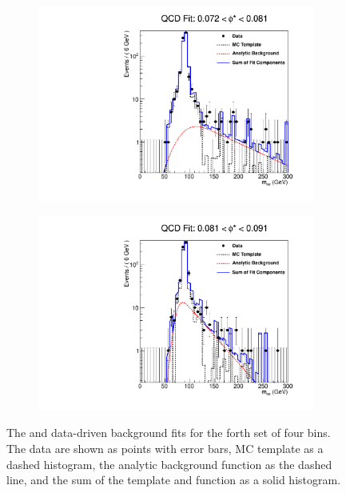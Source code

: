 \begin{figure}[!htbp]
\begin{subfigure}[b]{\SideBySidePlotWidth}
        \includegraphics[width=\linewidth]{figures/qcd_fits/qcd_fit_plot_for_15.pdf}
        \label{fig:qcd_fit_15}
    \end{subfigure}%
    \begin{subfigure}[b]{\SideBySidePlotWidth}
        \includegraphics[width=\linewidth]{figures/qcd_fits/qcd_fit_plot_for_16.pdf}
        \label{fig:qcd_fit_16}
    \end{subfigure}
    \caption[
        The \QCDjets and \wjets data-driven background fits for the forth set of
        four \phistar bins.
    ]{
        The \QCDjets and \wjets data-driven background fits for the forth set of
        four \phistar bins. The data are shown as points with error bars, MC
        template as a dashed histogram, the analytic background function as the
        dashed line, and the sum of the template and function as a solid
        histogram.
    }
    \label{fig:qcd_many_4}
\end{figure}


